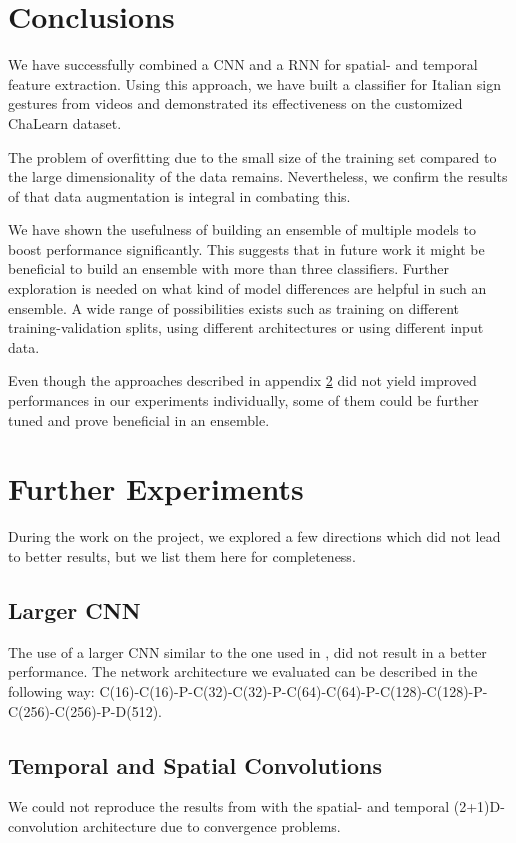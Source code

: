 \section{Conclusions}

We have successfully combined a CNN and a RNN for spatial- and temporal feature extraction. Using this approach, we have built a classifier for Italian sign gestures from videos and demonstrated its effectiveness on the customized ChaLearn dataset\cite{ChaLearn17}.

The problem of overfitting due to the small size of the training set compared to the large dimensionality of the data remains. Nevertheless, we confirm the results of \cite{Pigou16} that data augmentation is integral in combating this.

We have shown the usefulness of building an ensemble of multiple models to boost performance significantly.
This suggests that in future work it might be beneficial to build an ensemble with more than three classifiers.
Further exploration is needed on what kind of model differences are helpful in such an ensemble.
A wide range of possibilities exists such as training on different training-validation splits, using different architectures or using different input data.

Even though the approaches described in appendix \ref{appendix} did not yield improved performances in our experiments individually, some of them could be further tuned and prove beneficial in an ensemble.


\appendix

\section{Further Experiments}\label{appendix}

During the work on the project, we explored a few directions which did not lead to better results, but we list them here for completeness.

\subsection{Larger CNN}
The use of a larger CNN similar to the one used in \cite{Pigou16}, \cite{Simonyan15} did not result in a better performance.
The network architecture we evaluated can be described in the following way: C(16)-C(16)-P-C(32)-C(32)-P-C(64)-C(64)-P-C(128)-C(128)-P-C(256)-C(256)-P-D(512).

\subsection{Temporal and Spatial Convolutions}
We could not reproduce the results from \cite{Pigou16} with the spatial- and temporal (2+1)D-convolution architecture due to convergence problems.

